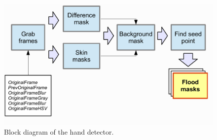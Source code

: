 \documentclass[11pt,a4paper]{article}
\begin{document}
\begin{figure}[tbh]
\centering
\includegraphics[width=13cm]{images/hand_detector}
\caption{Block diagram of the hand detector.}
\label{hand_detector}
\end{figure}
\end{document}
